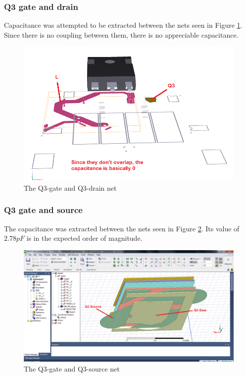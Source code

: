 \subsubsection{Q3 gate and drain}
\label{sec:q3_gate_drain}

Capacitance was attempted to be extracted between the nets seen in Figure \ref{fig:cap_q3_g_d}. Since there is no coupling between them, there is no appreciable capacitance.

\begin{figure}[H]
	\centering
	\includegraphics[width=\textwidth]{pictures/implementation/cap/cap_q3_g_d.PNG}
	\caption{The Q3-gate and Q3-drain net}
	\label{fig:cap_q3_g_d}
\end{figure}

\subsubsection{Q3 gate and source}
\label{sec:q3_gate_source}

The capacitance was extracted between the nets seen in Figure \ref{fig:cap_q3_g_s}. Its value of $2.78 pF$ is in the expected order of magnitude.

\begin{figure}[H]
	\centering
	\includegraphics[width=\textwidth]{pictures/implementation/cap/cap_q3_g_s.PNG}
	\caption{The Q3-gate and Q3-source net}
	\label{fig:cap_q3_g_s}
\end{figure}

